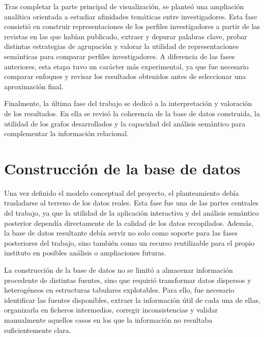 \documentclass[11pt,spanish,listoffigures,listoftables]{tfgetsinf}
\begin{document}
Tras completar la parte principal de visualización, se planteó una ampliación analítica orientada a estudiar afinidades temáticas entre investigadores. Esta fase consistió en construir representaciones de los perfiles investigadores a partir de las revistas en las que habían publicado, extraer y depurar palabras clave, probar distintas estrategias de agrupación y valorar la utilidad de representaciones semánticas para comparar perfiles investigadores. A diferencia de las fases anteriores, esta etapa tuvo un carácter más experimental, ya que fue necesario comparar enfoques y revisar los resultados obtenidos antes de seleccionar una aproximación final.

Finalmente, la última fase del trabajo se dedicó a la interpretación y valoración de los resultados. En ella se revisó la coherencia de la base de datos construida, la utilidad de los grafos desarrollados y la capacidad del análisis semántico para complementar la información relacional.



\chapter{Construcción de la base de datos}

Una vez definido el modelo conceptual del proyecto, el planteamiento debía trasladarse al terreno de los datos reales. Esta fase fue una de las partes centrales del trabajo, ya que la utilidad de la aplicación interactiva y del análisis semántico posterior dependía directamente de la calidad de los datos recopilados. Además, la base de datos resultante debía servir no solo como soporte para las fases posteriores del trabajo, sino también como un recurso reutilizable para el propio instituto en posibles análisis o ampliaciones futuras.

La construcción de la base de datos no se limitó a almacenar información procedente de distintas fuentes, sino que requirió transformar datos dispersos y heterogéneos en estructuras tabulares explotables. Para ello, fue necesario identificar las fuentes disponibles, extraer la información útil de cada una de ellas, organizarla en ficheros intermedios, corregir inconsistencias y validar manualmente aquellos casos en los que la información no resultaba suficientemente clara.
\end{document}
